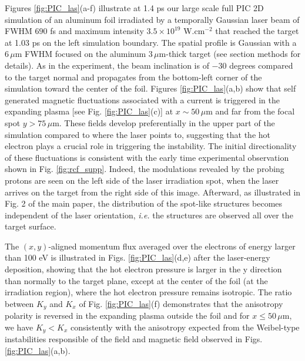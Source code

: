 \documentclass[aps,showpacs,superscriptaddress]{revtex4}
\begin{document}
Figures \ref{fig:PIC_las}(a-f) illustrate at 1.4 ps our large scale full PIC 2D simulation of an aluminum foil irradiated by a  temporally Gaussian laser beam of  FWHM $690$ fs and maximum intensity $3.5 \times 10^{19}$ W.cm$^{-2}$ that reached the target at 1.03 ps on the left simulation boundary. The spatial profile is Gaussian with a $6\, \mu$m FWHM focused on the aluminum $3\,\mu$m-thick target (see section methods for details). 
As in the experiment, the beam inclination is of  $-30$ degrees compared to the target normal and propagates from the bottom-left corner of the simulation toward the center of the foil.
Figures \ref{fig:PIC_las}(a,b) show that self generated magnetic fluctuations associated with a current is triggered in the expanding plasma [see Fig. \ref{fig:PIC_las}(c)] at $x\sim 50 \, \mu$m and far from the focal spot $y>75\, \mu$m. These fields develop preferentially in the upper part of the simulation compared to where the laser points to, suggesting that the  hot electron plays a crucial role in triggering the instability. The initial directionality of these fluctuations is consistent with the early time experimental observation shown in Fig. \ref{fig:rcf_supp}.
Indeed, the modulations revealed by the probing protons are seen on the left side of the laser irradiation spot, when the laser arrives on the target from the right side of this image. 
Afterward, as illustrated in Fig. 2 of the main paper, the distribution of the spot-like structures   becomes independent of the laser orientation, \emph{i.e.} the structures are observed all over the target surface.

The $(x,y)$-aligned momentum flux  averaged over the electrons of energy larger than 100 eV is  illustrated  in Figs.  \ref{fig:PIC_las}(d,e) after the laser-energy deposition, showing that the hot electron pressure is larger in the y direction than normally to the target plane, except at the center of the foil (at the irradiation region), where the hot electron pressure remains isotropic. 
The ratio between $K_y$ and $K_x$ of Fig. \ref{fig:PIC_las}(f) demonstrates that  the anisotropy polarity is reversed  in the expanding plasma outside the foil and for $x \le 50\, \mu$m, we have $K_y < K_x$ consistently with the anisotropy expected from the Weibel-type instabilities responsible of the field and magnetic field observed in Figs.  \ref{fig:PIC_las}(a,b).
\end{document}
